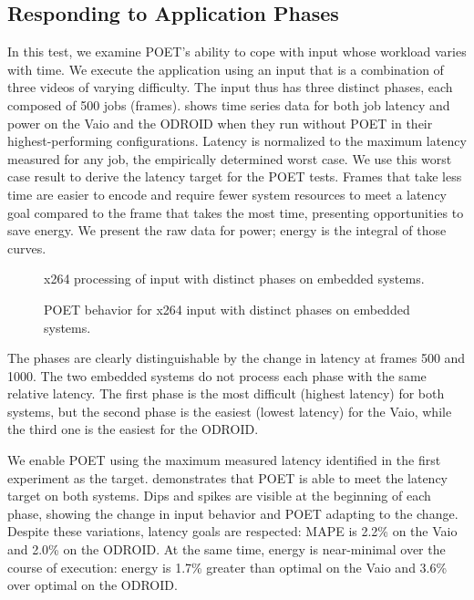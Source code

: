 \subsection{Responding to Application Phases}

In this test, we examine POET's ability to cope with input whose workload varies with time.
We execute the  application using an input that is a combination of three videos of varying difficulty.
The input thus has three distinct phases, each composed of 500 jobs (frames).
 shows time series data for both job latency and power on the Vaio and the ODROID when they run without POET in their highest-performing configurations.
Latency is normalized to the maximum latency measured for any job, \ie the empirically determined worst case.
We use this worst case result to derive the latency target for the POET tests.
Frames that take less time are easier to encode and require fewer system resources to meet a latency goal compared to the frame that takes the most time, presenting opportunities to save energy.
We present the raw data for power; energy is the integral of those curves.

\begin{figure}[t]
  \centering
  
  \caption{x264 processing of input with distinct phases on embedded systems.}
  \label{fig:poet-embedded-phases-default}
\end{figure}
\begin{figure}[t]
  \centering
      
  \caption{POET behavior for x264 input with distinct phases on embedded systems.}
  \label{fig:poet-embedded-phases-x264}
\end{figure}

The phases are clearly distinguishable by the change in latency at frames 500 and 1000.
The two embedded systems do not process each phase with the same relative latency.
The first phase is the most difficult (highest latency) for both systems, but the second phase is the easiest (lowest latency) for the Vaio, while the third one is the easiest for the ODROID.

We enable POET using the maximum measured latency identified in the first experiment as the target.
 demonstrates that POET is able to meet the latency target on both systems.
Dips and spikes are visible at the beginning of each phase, showing the change in input behavior and POET adapting to the change.
Despite these variations, latency goals are respected: MAPE is 2.2\% on the Vaio and 2.0\% on the ODROID.
At the same time, energy is near-minimal over the course of execution: energy is 1.7\% greater than optimal on the Vaio and 3.6\% over optimal on the ODROID.


